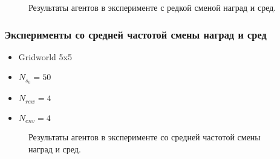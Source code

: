 \documentclass[a4paper]{article}
\begin{document}
\begin{figure}
  \centering
  \begin{minipage}{.32\linewidth}
    
    
  \end{minipage}
  \begin{minipage}{.32\linewidth}
    
    
  \end{minipage}
  \begin{minipage}{.32\linewidth}
    
    
  \end{minipage}
  \caption{Результаты агентов в эксперименте с редкой сменой наград и сред.}
\end{figure}

\subsubsection{Эксперименты со средней частотой смены наград и сред}

\begin{itemize}
  \item Gridworld 5x5
  \item $N_{s_0} = 50$
  \item $N_{rew} = 4$
  \item $N_{env} = 4$
\end{itemize}

\begin{figure}
  \centering
  \begin{minipage}{.32\linewidth}
    
    
  \end{minipage}
  \begin{minipage}{.32\linewidth}
    
    
  \end{minipage}
  \begin{minipage}{.32\linewidth}
    
    
  \end{minipage}
  \caption{Результаты агентов в эксперименте со средней частотой смены наград и сред.}
\end{figure}
\end{document}
